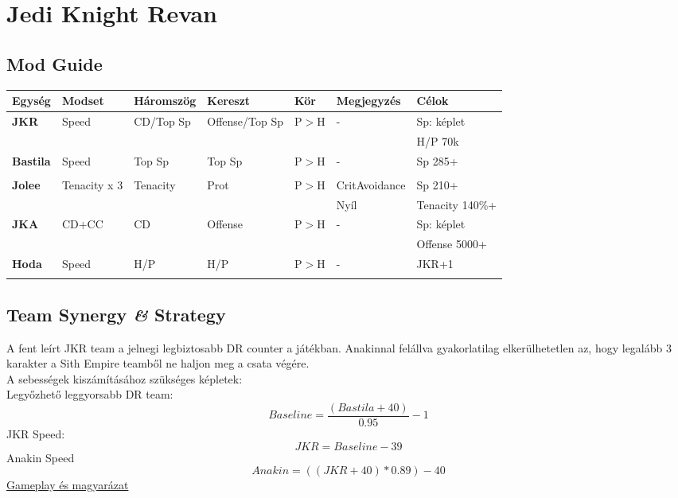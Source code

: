 \documentclass[11pt]{report}
\begin{document}

\chapter{Jedi Knight Revan}
\section{Mod Guide}
\begin{center}
    \begin{tabular}{|l | l | l | l | l | l | l |}
        \hline
        Egység & Modset & Háromszög & Kereszt & Kör & Megjegyzés & Célok\\ \hline
        \textbf{JKR} & Speed & CD/Top Sp & Offense/Top Sp & P$>$H & - & Sp: képlet\\ 
        &  &  &  &  &  & H/P 70k\\ \hline
        \textbf{Bastila} & Speed & Top Sp & Top Sp & P$>$H & - & Sp 285+\\
        &  &  &  &  &  & \\ \hline        
        \textbf{Jolee} & Tenacity x 3 & Tenacity & Prot & P$>$H & CritAvoidance & Sp 210+\\
        &  &  &  &  & Nyíl & Tenacity 140\%+\\ \hline
        \textbf{JKA} & CD+CC & CD & Offense & P$>$H & - & Sp: képlet\\
        &  &  &  &  &  & Offense 5000+\\ \hline
        \textbf{Hoda} & Speed & H/P & H/P & P$>$H & - & JKR+1\\
        &  &  &  &  &  &  \\ \hline
    \end{tabular}
\end{center}
\section{Team Synergy \textit{\&} Strategy}
A fent leírt JKR team a jelnegi legbiztosabb DR counter a játékban. Anakinnal felállva gyakorlatilag elkerülhetetlen az, hogy legalább 3 karakter a Sith Empire teamből ne haljon meg a csata végére.\\
A sebességek kiszámításához szükséges képletek:\\
Legyőzhető leggyorsabb DR team:
\begin{equation}
    Baseline=\frac{(Bastila+40)}{0.95}-1
\end{equation}
JKR Speed:
\begin{equation}
    JKR=Baseline-39
\end{equation}
Anakin Speed
\begin{equation}
    Anakin=((JKR+40)*0.89)-40
\end{equation}
\href{https://youtu.be/IH_Xo9CuSho}{Gameplay és magyarázat}
\end{document}
